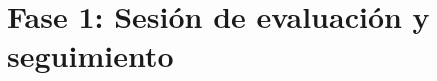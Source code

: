 \section{Fase 1: Sesión de evaluación y seguimiento}


\pagebreak

\pagebreak

\pagebreak

\pagebreak

\pagebreak

\pagebreak
